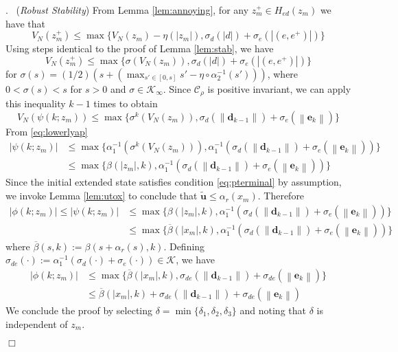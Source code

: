 \documentclass{article}
\newenvironment{proof}{\noindent {\em Proof}.\ }{\hspace*{\fill}$\Box$\medskip\\}
\newcommand{\abs}[1]{\left\lvert #1 \right\rvert}
\newcommand{\norm}[1]{\left\lVert #1 \right\rVert}
\begin{document}
\begin{proof}
(\emph{Robust Stability}) 
From Lemma \ref{lem:annoying},
for any $z_m^+ \in H_{ed}(z_m)$ we have that
\begin{equation*}
V_N(z_m^+) \leq \max\{V_N(z_m)-\eta(\abs{z_m}),\sigma_d(\abs{d})+
\sigma_e(\abs{(e,e^+)})\}
\end{equation*}
Using steps identical to the proof of Lemma \ref{lem:stab}, we have 
\begin{equation*}
V_N(z_m^+) \leq \max\{\sigma(V_N(z_m)),\sigma_d(\abs{d})+\sigma_e(\abs{(e,e^+)})\}
\end{equation*}
for $\sigma(s) = (1/2)(s+\left(\max_{s' \in [0,s]}s'-\eta \circ \alpha_2^{-1}(s')\right))$, where 
$0 < \sigma(s) < s$ for $s > 0$ and $\sigma \in \mathcal{K}_\infty$. Since 
$\mathcal{C}_\rho$ is positive invariant, we can apply this inequality $k-1$ times to obtain
\begin{equation*}
V_N(\psi(k;z_m)) \leq \max\{\sigma^k(V_N(z_m)),\sigma_d(\norm{\mathbf{d}_{k-1}})+\sigma_e(\norm{\mathbf{e}_k})\}
\end{equation*}
From \eqref{eq:lowerlyap}
\begin{align*}
\abs{\psi(k;z_m)} &\leq \max\{\alpha_1^{-1}(\sigma^k(V_N(z_m))),\alpha_1^{-1}(\sigma_d(\norm{\mathbf{d}_{k-1}})+\sigma_e(\norm{\mathbf{e}_k}))\} \\
&\leq \max\{\beta(\abs{z_m},k),\alpha_1^{-1}(\sigma_d(\norm{\mathbf{d}_{k-1}})+\sigma_e(\norm{\mathbf{e}_k}))\}
\end{align*}
Since the initial extended state satisfies condition \eqref{eq:pterminal} by assumption, we invoke
Lemma \ref{lem:utox} to conclude that $\tilde{\mathbf{u}} \leq \alpha_r(x_m)$. Therefore
\begin{align*}
\abs{\phi(k;z_m)} \leq \abs{\psi(k;z_m)} &\leq \max\{\beta(\abs{z_m},k),\alpha_1^{-1}(\sigma_d(\norm{\mathbf{d}_{k-1}})+\sigma_e(\norm{\mathbf{e}_k}))\} \\
&\leq \max\{\overline{\beta}(\abs{x_m},k),\alpha_1^{-1}(\sigma_d(\norm{\mathbf{d}_{k-1}})+\sigma_e(\norm{\mathbf{e}_k}))\}
\end{align*}
where $\overline{\beta}(s,k) := \beta(s+\alpha_r(s),k)$. Defining $\sigma_{de}(\cdot) :=
\alpha_1^{-1}(\sigma_d(\cdot)+\sigma_e(\cdot)) \in \mathcal{K}$, we have
\begin{align*}
\abs{\phi(k;z_m)} &\leq \max\{\overline{\beta}(\abs{x_m},k),\sigma_{de}(\norm{\mathbf{d}_{k-1}})+\sigma_{de}(\norm{\mathbf{e}_{k}})\} \\
&\leq \overline{\beta}(\abs{x_m},k)+\sigma_{de}(\norm{\mathbf{d}_{k-1}})+\sigma_{de}(\norm{\mathbf{e}_{k}})
\end{align*}
We conclude the proof by selecting $\delta = \min \{\delta_1,\delta_2,\delta_3\}$ and noting that
$\delta$ is independent of $z_m$.

\end{proof}
\end{document}
